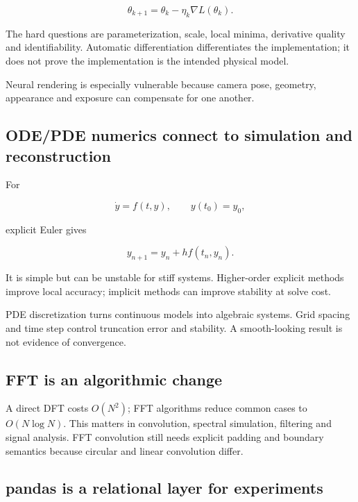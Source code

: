 \[
\theta_{k+1}=\theta_k-\eta_k\nabla L(\theta_k).
\]

The hard questions are parameterization, scale, local minima, derivative quality and identifiability. Automatic differentiation differentiates the implementation; it does not prove the implementation is the intended physical model.

Neural rendering is especially vulnerable because camera pose, geometry, appearance and exposure can compensate for one another.

\subsection{ODE/PDE numerics connect to simulation and reconstruction}\label{01-foundations-i-ch017-odepde-numerics-connect-to-simulation-and-reconstruction}

\hypertarget{01-foundations-i-ch017-odepde-numerics-connect-to-simulation-and-reconstruction}{}

For

\[
\dot y=f(t,y),\qquad y(t_0)=y_0,
\]

explicit Euler gives

\[
y_{n+1}=y_n+h f(t_n,y_n).
\]

It is simple but can be unstable for stiff systems. Higher-order explicit methods improve local accuracy; implicit methods can improve stability at solve cost.

PDE discretization turns continuous models into algebraic systems. Grid spacing and time step control truncation error and stability. A smooth-looking result is not evidence of convergence.

\subsection{FFT is an algorithmic change}\label{01-foundations-i-ch017-fft-is-an-algorithmic-change}

\hypertarget{01-foundations-i-ch017-fft-is-an-algorithmic-change}{}

A direct DFT costs \(O(N^2)\); FFT algorithms reduce common cases to \(O(N\log N)\). This matters in convolution, spectral simulation, filtering and signal analysis. FFT convolution still needs explicit padding and boundary semantics because circular and linear convolution differ.

\subsection{pandas is a relational layer for experiments}\label{01-foundations-i-ch017-pandas-is-a-relational-layer-for-experiments}

